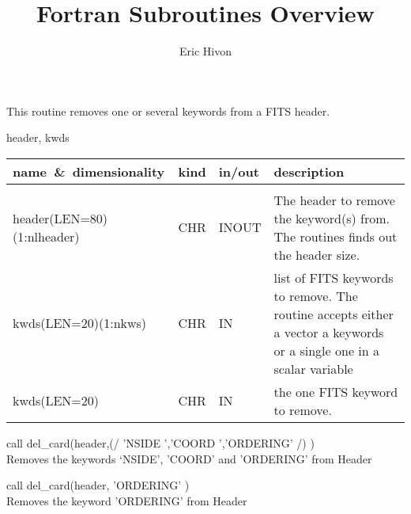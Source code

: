 
\sloppy

\title{\healpix Fortran Subroutines Overview}
 \section[del\_card]{ }
\label{sub:del_card}
\author{Eric Hivon}

\begin{facility}
{This routine removes one or several keywords from a FITS header.}
{\modHeadFits}
\end{facility}

\begin{f90format}
{header, kwds}
\end{f90format}

\begin{arguments}
{
\begin{tabular}{p{0.4\hsize} p{0.05\hsize} p{0.1\hsize} p{0.35\hsize}} \hline  
\textbf{name~\&~dimensionality} & \textbf{kind} & \textbf{in/out} & \textbf{description} \\ \hline
                   &   &   &                           \\ %
header(LEN=80)(1:nlheader) & CHR & INOUT & The header to remove the keyword(s)
                   from. The routines finds out the header size.\\
kwds(LEN=20)(1:nkws) & CHR & IN & list of FITS keywords to
                   remove. The routine accepts either a vector a keywords or a
                   single one in a scalar variable\\
kwds(LEN=20)  & CHR & IN & the one FITS keyword to
                   remove.\\
\end{tabular}
}
\end{arguments}

\begin{examples}{1}
{
call del\_card(header,(/ 'NSIDE   ','COORD   ','ORDERING' /) ) \\
}
{
Removes the keywords `NSIDE', 'COORD' and 'ORDERING' from Header
}
\end{examples}

\begin{examples}{2}
{
call del\_card(header, 'ORDERING' ) \\
}
{
Removes the keyword 'ORDERING' from Header
}
\end{examples}

